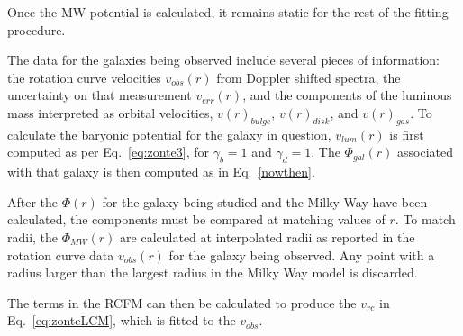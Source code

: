 \documentclass[reprint,%
 amsmath,amssymb,
 aps,
]{revtex4-1}
\begin{document}
Once the MW potential is calculated, it remains static for the rest of the fitting procedure.  

The data for the   galaxies being observed include several pieces of information: the rotation curve velocities $v_{obs}(r)$ from Doppler shifted spectra, the uncertainty on that measurement $v_{err}(r)$, and the components of the luminous mass interpreted as orbital velocities,  $v(r)_{bulge}$, $v(r)_{disk}$, and $v(r)_{gas}$. 
To calculate the baryonic potential for the galaxy in question, $v_{lum}(r)$ is first computed   as per Eq.~\ref{eq:zonte3}, for $\gamma_b=1$ and $\gamma_d=1$. The $\Phi_{gal}(r)$ associated with that galaxy   is then computed as in Eq.~\ref{nowthen}.

After the $\Phi(r)$ for the galaxy being studied and the Milky Way have been calculated,   the components must be compared at  matching values of $r$. To match radii, the $\Phi_{MW}(r)$ are calculated at  interpolated   radii as reported in the 
rotation curve data $v_{obs}(r)$ for the galaxy being observed. Any point with a radius larger than the largest radius in the Milky Way model is discarded.

The terms in the RCFM   can then be calculated  to produce the  $v_{rc}$ in Eq.~\ref{eq:zonteLCM}, which is  fitted to the  $v_{obs}$. 

 






\end{document}
